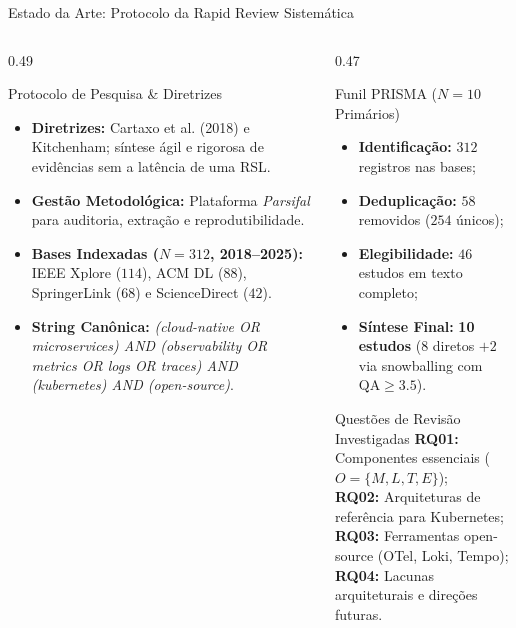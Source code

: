 \documentclass[aspectratio=169, 10pt]{beamer}
\begin{document}
\begin{frame}{Estado da Arte: Protocolo da Rapid Review Sistemática}
  \begin{columns}[T]
    \begin{column}{0.49\textwidth}
      \begin{block}{Protocolo de Pesquisa \& Diretrizes}
        \small
        \begin{itemize}
          \item \textbf{Diretrizes:} Cartaxo et al. (2018) e Kitchenham; síntese ágil e rigorosa de evidências sem a latência de uma RSL.
          \item \textbf{Gestão Metodológica:} Plataforma \textit{Parsifal} para auditoria, extração e reprodutibilidade.
          \item \textbf{Bases Indexadas ($N = 312$, 2018--2025):}\\
          IEEE Xplore ($114$), ACM DL ($88$), SpringerLink ($68$) e ScienceDirect ($42$).
          \item \textbf{String Canônica:} \textit{(cloud-native OR microservices) AND (observability OR metrics OR logs OR traces) AND (kubernetes) AND (open-source)}.
        \end{itemize}
      \end{block}
    \end{column}
    
    \begin{column}{0.47\textwidth}
      \begin{block}{Funil PRISMA ($N = 10$ Primários)}
        \small
        \begin{itemize}
          \item \textbf{Identificação:} $312$ registros nas bases;
          \item \textbf{Deduplicação:} $58$ removidos ($254$ únicos);
          \item \textbf{Elegibilidade:} $46$ estudos em texto completo;
          \item \textbf{Síntese Final:} \textbf{10 estudos} (8 diretos $+ 2$ via snowballing com $\text{QA} \ge 3.5$).
        \end{itemize}
      \end{block}
      \vspace{0.4ex}
      \begin{exampleblock}{Questões de Revisão Investigadas}
        \scriptsize
        \textbf{RQ01:} Componentes essenciais ($O = \{M, L, T, E\}$);\\[1pt]
        \textbf{RQ02:} Arquiteturas de referência para Kubernetes;\\[1pt]
        \textbf{RQ03:} Ferramentas open-source (OTel, Loki, Tempo);\\[1pt]
        \textbf{RQ04:} Lacunas arquiteturais e direções futuras.
      \end{exampleblock}
    \end{column}
  \end{columns}
\end{frame}
\end{document}
